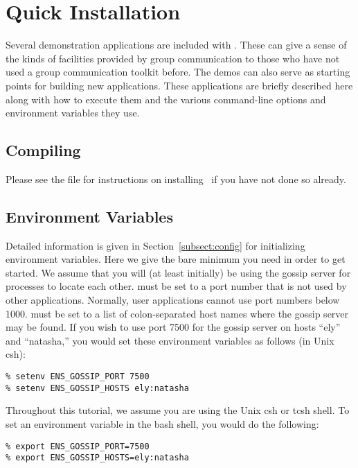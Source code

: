 %
%
%
\section{Quick Installation} 

Several demonstration applications are included with \ensemble.
These can give a sense of the kinds of facilities provided by group
communication to those who have not used a group communication
toolkit before.  The demos can also serve as starting points for
building new applications.  These applications are briefly described
here along with how to execute them and the various command-line
options and environment variables they use.

\subsection{Compiling}
Please see the file  for instructions on
installing \ensemble\ if you have not done so already.

\subsection{Environment Variables}
Detailed information is given in Section~\ref{subsect:config} for
initializing environment variables.  Here we give the bare minimum
you need in order to get started.  We assume that you will (at least
initially) be using the gossip server for processes to locate each
other.   must be set to a port number that
is not used by other applications.  Normally, user applications
cannot use port numbers below 1000.   must
be set to a list of colon-separated host names where the gossip
server may be found.  If you wish to use port 7500 for the gossip
server on hosts ``ely'' and ``natasha,'' you would set these
environment variables as follows (in Unix csh):
\begin{verbatim}
% setenv ENS_GOSSIP_PORT 7500
% setenv ENS_GOSSIP_HOSTS ely:natasha
\end{verbatim}

Throughout this tutorial, we assume you are using the Unix csh or
tcsh shell.  To set an environment variable in the bash shell, you
would do the following:
\begin{verbatim}
% export ENS_GOSSIP_PORT=7500
% export ENS_GOSSIP_HOSTS=ely:natasha
\end{verbatim}

